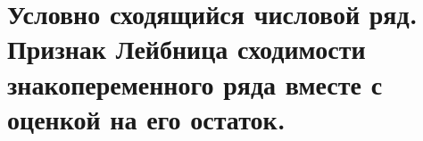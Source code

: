 \section{Условно сходящийся числовой ряд. Признак Лейбница сходимости знакопеременного ряда вместе с оценкой на его остаток.}